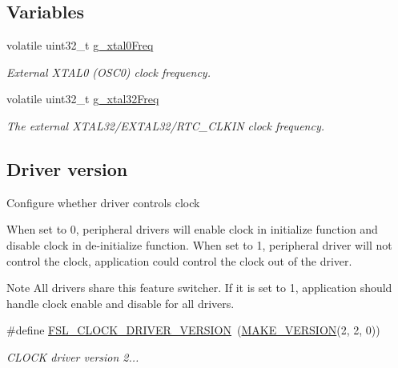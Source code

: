 \subsection*{Variables}
\begin{DoxyCompactItemize}
\item 
volatile uint32\+\_\+t \mbox{\hyperlink{group__clock_ga70a4a6ffb6c5a7a271aad89fe482bafc}{g\+\_\+xtal0\+Freq}}
\begin{DoxyCompactList}\small\item\em External X\+T\+A\+L0 (O\+S\+C0) clock frequency. \end{DoxyCompactList}\item 
volatile uint32\+\_\+t \mbox{\hyperlink{group__clock_ga170d2fd7c6b439b72e0f73b4d73443af}{g\+\_\+xtal32\+Freq}}
\begin{DoxyCompactList}\small\item\em The external X\+T\+A\+L32/\+E\+X\+T\+A\+L32/\+R\+T\+C\+\_\+\+C\+L\+K\+IN clock frequency. \end{DoxyCompactList}\end{DoxyCompactItemize}
\subsection*{Driver version}
\label{_amgrp4997ed747fd8b1394cd55bb561638330}%
Configure whether driver controls clock

When set to 0, peripheral drivers will enable clock in initialize function and disable clock in de-\/initialize function. When set to 1, peripheral driver will not control the clock, application could control the clock out of the driver.

\begin{DoxyNote}{Note}
All drivers share this feature switcher. If it is set to 1, application should handle clock enable and disable for all drivers. 
\end{DoxyNote}
\begin{DoxyCompactItemize}
\item 
\mbox{\label{group__clock_ga0c0cf401613f31feb4a9eb723ad51154}} 
\#define \mbox{\hyperlink{group__clock_ga0c0cf401613f31feb4a9eb723ad51154}{F\+S\+L\+\_\+\+C\+L\+O\+C\+K\+\_\+\+D\+R\+I\+V\+E\+R\+\_\+\+V\+E\+R\+S\+I\+ON}}~(\mbox{\hyperlink{group__ftfx__utilities_ga812138aa3315b0c6953c1a26130bcc37}{M\+A\+K\+E\+\_\+\+V\+E\+R\+S\+I\+ON}}(2, 2, 0))
\begin{DoxyCompactList}\small\item\em C\+L\+O\+CK driver version 2... \end{DoxyCompactList}\end{DoxyCompactItemize}
